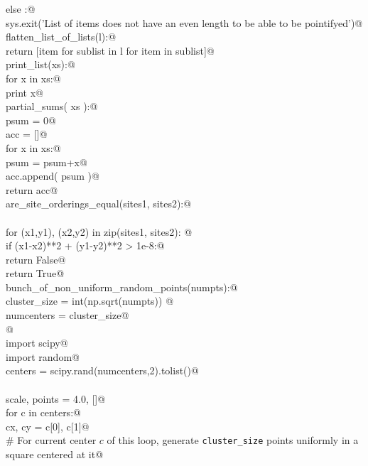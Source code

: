 \documentclass[10.0pt]{report}
\begin{document}
\begin{appendices}
\begin{flushleft}
\begin{list}{}{}
\mbox{}\verb@    else :@\\
\mbox{}\verb@        sys.exit('List of items does not have an even length to be able to be pointifyed')@\\
\mbox{}\verb@def flatten_list_of_lists(l):@\\
\mbox{}\verb@       return [item for sublist in l for item in sublist]@\\
\mbox{}\verb@def print_list(xs):@\\
\mbox{}\verb@    for x in xs:@\\
\mbox{}\verb@        print x@\\
\mbox{}\verb@def partial_sums( xs ):@\\
\mbox{}\verb@    psum = 0@\\
\mbox{}\verb@    acc = []@\\
\mbox{}\verb@    for x in xs:@\\
\mbox{}\verb@        psum = psum+x@\\
\mbox{}\verb@        acc.append( psum )@\\
\mbox{}\verb@    return acc@\\
\mbox{}\verb@def are_site_orderings_equal(sites1, sites2):@\\
\mbox{}\verb@@\\
\mbox{}\verb@    for (x1,y1), (x2,y2) in zip(sites1, sites2): @\\
\mbox{}\verb@        if (x1-x2)**2 + (y1-y2)**2 > 1e-8:@\\
\mbox{}\verb@            return False@\\
\mbox{}\verb@    return True@\\
\mbox{}\verb@def bunch_of_non_uniform_random_points(numpts):@\\
\mbox{}\verb@    cluster_size = int(np.sqrt(numpts)) @\\
\mbox{}\verb@    numcenters   = cluster_size@\\
\mbox{}\verb@    @\\
\mbox{}\verb@    import scipy@\\
\mbox{}\verb@    import random@\\
\mbox{}\verb@    centers = scipy.rand(numcenters,2).tolist()@\\
\mbox{}\verb@@\\
\mbox{}\verb@    scale, points = 4.0, []@\\
\mbox{}\verb@    for c in centers:@\\
\mbox{}\verb@        cx, cy = c[0], c[1]@\\
\mbox{}\verb@        # For current center $c$ of this loop, generate \verb|cluster_size| points uniformly in a square centered at it@\\

\end{list}
\end{flushleft}
\end{appendices}
\end{document}
